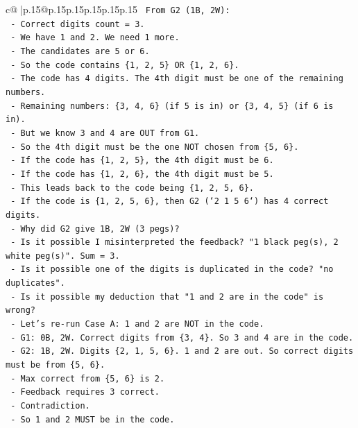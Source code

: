 \documentclass{article}
\begin{document}
{\begin{supertabular}{c@{$\;$}|p{.15\linewidth}@{}p{.15\linewidth}p{.15\linewidth}p{.15\linewidth}p{.15\linewidth}p{.15\linewidth}}
{{{\texttt{    From G2 (1B, 2W):} \\
\texttt{    {-} Correct digits count = 3.} \\
\texttt{    {-} We have 1 and 2. We need 1 more.} \\
\texttt{    {-} The candidates are 5 or 6.} \\
\texttt{    {-} So the code contains \{1, 2, 5\} OR \{1, 2, 6\}.} \\
\texttt{    {-} The code has 4 digits. The 4th digit must be one of the remaining numbers.} \\
\texttt{    {-} Remaining numbers: \{3, 4, 6\} (if 5 is in) or \{3, 4, 5\} (if 6 is in).} \\
\texttt{    {-} But we know 3 and 4 are OUT from G1.} \\
\texttt{    {-} So the 4th digit must be the one NOT chosen from \{5, 6\}.} \\
\texttt{    {-} If the code has \{1, 2, 5\}, the 4th digit must be 6.} \\
\texttt{    {-} If the code has \{1, 2, 6\}, the 4th digit must be 5.} \\
\texttt{    {-} This leads back to the code being \{1, 2, 5, 6\}.} \\
\texttt{    {-} If the code is \{1, 2, 5, 6\}, then G2 (`2 1 5 6`) has 4 correct digits.} \\
\texttt{    {-} Why did G2 give 1B, 2W (3 pegs)?} \\
\texttt{    {-} Is it possible I misinterpreted the feedback? "1 black peg(s), 2 white peg(s)". Sum = 3.} \\
\texttt{    {-} Is it possible one of the digits is duplicated in the code? "no duplicates".} \\
\texttt{    {-} Is it possible my deduction that "1 and 2 are in the code" is wrong?} \\
\texttt{    {-} Let's re{-}run Case A: 1 and 2 are NOT in the code.} \\
\texttt{        {-} G1: 0B, 2W. Correct digits from \{3, 4\}. So 3 and 4 are in the code.} \\
\texttt{        {-} G2: 1B, 2W. Digits \{2, 1, 5, 6\}. 1 and 2 are out. So correct digits must be from \{5, 6\}.} \\
\texttt{        {-} Max correct from \{5, 6\} is 2.} \\
\texttt{        {-} Feedback requires 3 correct.} \\
\texttt{        {-} Contradiction.} \\
\texttt{    {-} So 1 and 2 MUST be in the code.} \\
}}}
\end{supertabular}}
\end{document}
